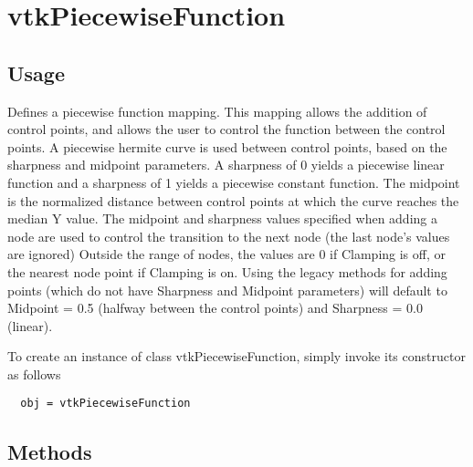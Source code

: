 \section{vtkPiecewiseFunction}

\subsection{Usage}

 Defines a piecewise function mapping. This mapping allows the addition
 of control points, and allows the user to control the function between
 the control points. A piecewise hermite curve is used between control 
 points, based on the sharpness and midpoint parameters. A sharpness of
 0 yields a piecewise linear function and a sharpness of 1 yields a
 piecewise constant function. The midpoint is the normalized distance
 between control points at which the curve reaches the median Y value.
 The midpoint and sharpness values specified when adding a node are used
 to control the transition to the next node (the last node's values are
 ignored) Outside the range of nodes, the values are 0 if Clamping is off,
 or the nearest node point if Clamping is on. Using the legacy methods for
 adding points  (which do not have Sharpness and Midpoint parameters) 
 will default to Midpoint = 0.5 (halfway between the control points) and
 Sharpness = 0.0 (linear).

To create an instance of class vtkPiecewiseFunction, simply
invoke its constructor as follows
\begin{verbatim}
  obj = vtkPiecewiseFunction
\end{verbatim}
\subsection{Methods}

